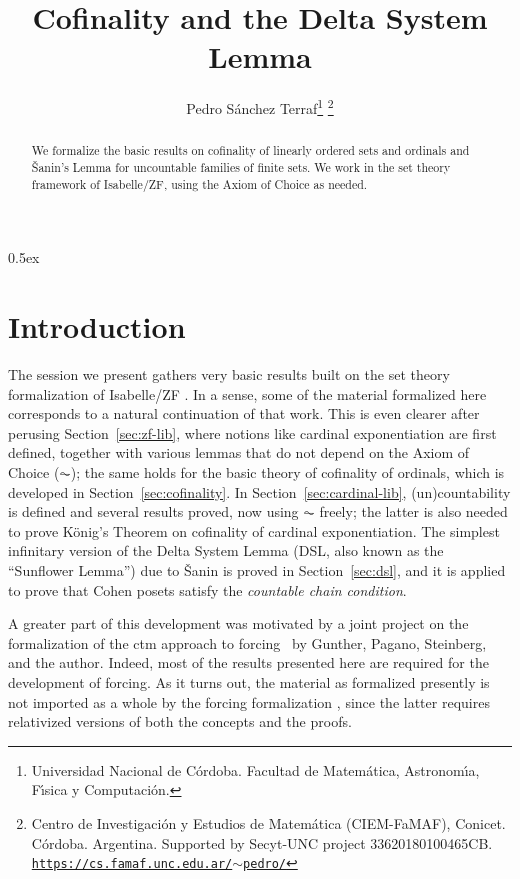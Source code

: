 \documentclass[11pt,a4paper]{article}
\begin{document}
\title{Cofinality and the Delta System Lemma}
\author{
  Pedro S\'anchez Terraf\thanks{Universidad Nacional de C\'ordoba. 
    Facultad de Matem\'atica, Astronom\'{\i}a,  F\'{\i}sica y
    Computaci\'on.}
  \thanks{%
    Centro de Investigaci\'on y Estudios de Matem\'atica
    (CIEM-FaMAF), Conicet. C\'ordoba. Argentina.
    Supported by Secyt-UNC project 33620180100465CB.
    \href{https://cs.famaf.unc.edu.ar/~pedro/}{\texttt{https://cs.famaf.unc.edu.ar/$\sim$pedro/}}}
}
\maketitle

\begin{abstract}
  We formalize the basic results on cofinality of linearly ordered
  sets and ordinals and \v{S}anin's Lemma for uncountable families of
  finite sets. We work in the set theory framework of
  Isabelle/ZF, using the Axiom of Choice as needed.
\end{abstract}


\tableofcontents

\parindent 0pt\parskip 0.5ex

\section{Introduction}

The session we present gathers very basic results built on the set
theory formalization of Isabelle/ZF
\cite{DBLP:journals/jar/PaulsonG96}. In a sense, some of the material
formalized here corresponds to a natural continuation of that
work. This is even clearer after perusing Section~\ref{sec:zf-lib},
where notions like cardinal exponentiation are first defined, together
with various lemmas that do not depend on the Axiom of Choice ($\AC$);
the same holds for the basic theory of cofinality of ordinals, which
is developed in Section~\ref{sec:cofinality}. In
Section~\ref{sec:cardinal-lib}, (un)countability is defined
and several results proved, now using $\AC$ freely; the latter is also
needed to prove König's Theorem on cofinality of cardinal
exponentiation. The simplest infinitary version of the Delta
System Lemma (DSL, also known as the ``Sunflower Lemma'') due to  \v{S}anin
is proved in Section~\ref{sec:dsl}, and it is applied to prove
that Cohen posets satisfy the \emph{countable chain condition}.

A greater part of this development was motivated by a joint
project on the formalization of the ctm approach to
forcing~\cite{2020arXiv200109715G} by Gunther, Pagano, Steinberg, and
the author. Indeed, most of the results presented here are required
for the development of forcing. As it turns out, the material as
formalized presently is not imported as a whole by the forcing
formalization \cite{Transitive_Models-AFP,Independence_CH-AFP},
since the latter requires relativized versions of both the concepts
and the proofs.





\end{document}
